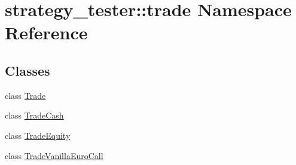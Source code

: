 \hypertarget{namespacestrategy__tester_1_1trade}{\section{strategy\-\_\-tester\-:\-:trade \-Namespace \-Reference}
\label{namespacestrategy__tester_1_1trade}
}
\subsection*{\-Classes}
\begin{DoxyCompactItemize}
\item 
class \hyperlink{classstrategy__tester_1_1trade_1_1Trade}{\-Trade}
\item 
class \hyperlink{classstrategy__tester_1_1trade_1_1TradeCash}{\-Trade\-Cash}
\item 
class \hyperlink{classstrategy__tester_1_1trade_1_1TradeEquity}{\-Trade\-Equity}
\item 
class \hyperlink{classstrategy__tester_1_1trade_1_1TradeVanillaEuroCall}{\-Trade\-Vanilla\-Euro\-Call}
\end{DoxyCompactItemize}
